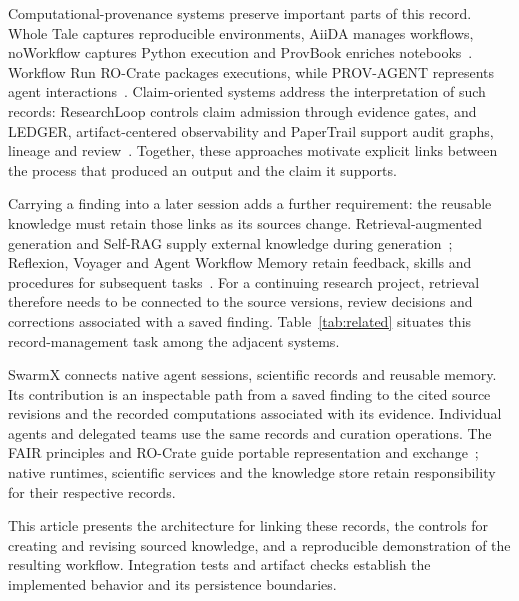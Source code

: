 \documentclass[preprint,12pt,a4paper]{elsarticle}
\begin{document}
Computational-provenance systems preserve important parts of this record. Whole Tale captures
reproducible environments, AiiDA manages workflows, noWorkflow captures Python execution and
ProvBook enriches notebooks~\cite{brinckman2019,pizzi2016,pimentel2017,samuel2018}.
Workflow Run RO-Crate packages executions, while PROV-AGENT represents agent
interactions~\cite{leo2024,souza2025a}. Claim-oriented systems address the interpretation of
such records: ResearchLoop controls claim admission through evidence gates, and LEDGER,
artifact-centered observability and PaperTrail support audit graphs, lineage and
review~\cite{xia2026,kim2026,yin2026,martin-boyle2026}. Together, these approaches motivate
explicit links between the process that produced an output and the claim it supports.

Carrying a finding into a later session adds a further requirement: the reusable knowledge must
retain those links as its sources change. Retrieval-augmented generation and Self-RAG supply
external knowledge during generation~\cite{lewis2020rag,asai2023selfrag}; Reflexion, Voyager
and Agent Workflow Memory retain feedback, skills and procedures for subsequent
tasks~\cite{shinn2023reflexion,wang2023voyager,wang2024workflowmemory}. For a continuing research
project, retrieval therefore needs to be connected to the source versions, review decisions
and corrections associated with a saved finding. Table~\ref{tab:related} situates this
record-management task among the adjacent systems.

SwarmX connects native agent sessions, scientific records and reusable memory. Its contribution
is an inspectable path from a saved finding to the cited source revisions and the recorded
computations associated with its evidence. Individual agents and delegated teams use the same
records and curation operations. The FAIR principles and RO-Crate guide portable representation
and exchange~\cite{wilkinson2016,soiland-reyes2022}; native runtimes, scientific services and
the knowledge store retain responsibility for their respective records.

This article presents the architecture for linking these records, the controls for creating
and revising sourced knowledge, and a reproducible demonstration of the resulting workflow.
Integration tests and artifact checks establish the implemented behavior and its persistence
boundaries.
\end{document}
